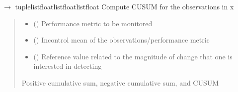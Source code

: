 \documentclass[letterpaper,10pt,oneside,english]{sphinxmanual}
\begin{document}
\begin{fulllineitems}
\begin{fulllineitems}
\begin{quote}
\begin{description}
\end{description}\end{quote}

\end{fulllineitems}


\begin{fulllineitems}
\label{\detokenize{ref_cusum:package.cusum.CUSUM.compute_cusum}}
\pysigstartsignatures
\pysiglinewithargsret
{}
{\sphinxparamcomma {}\sphinxparamcomma {}}
{{ $\rightarrow$ tuple\DUrole{p}{{[}}list\DUrole{p}{{[}}float\DUrole{p}{{]}}list\DUrole{p}{{[}}float\DUrole{p}{{]}}list\DUrole{p}{{[}}float\DUrole{p}{{]}}\DUrole{p}{{]}}}}
\pysigstopsignatures
\sphinxAtStartPar
Compute CUSUM for the observations in x
\begin{quote}\begin{description}
\begin{itemize}
\item {} 
\sphinxAtStartPar
{} (\sphinxstyleliteralemphasis{\sphinxupquote{{[}}}\sphinxstyleliteralemphasis{\sphinxupquote{{]}}}) \textendash{} Performance metric to be monitored

\item {} 
\sphinxAtStartPar
{} () \textendash{} In\sphinxhyphen{}control mean of the observations/performance metric

\item {} 
\sphinxAtStartPar
{} () \textendash{} Reference value related to the magnitude of change that one is interested in detecting

\end{itemize}

\sphinxAtStartPar
Positive cumulative sum, negative cumulative sum, and CUSUM


\end{description}
\end{quote}
\end{fulllineitems}
\end{fulllineitems}
\end{document}
